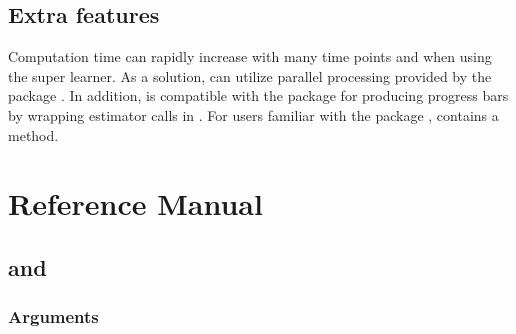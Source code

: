 \documentclass[]{jss}
\begin{document}
\hypertarget{extra-features}{%
\subsection{Extra features}\label{extra-features}}

Computation time can rapidly increase with many time points and when using the super learner. As a solution,  
can utilize parallel processing provided by the  package \citep{future}. In addition, 
 is compatible with the  package \citep{progressr} for producing progress bars by wrapping estimator calls in
. For users familiar with the  package \citep{broom},  contains a  method. 

\hypertarget{reference-manual}{%
\section{Reference Manual}\label{reference-manual}}

\subsection[lmtp_tmle and lmtp_sdr]{ and }

\subsubsection{Arguments}
\end{document}
